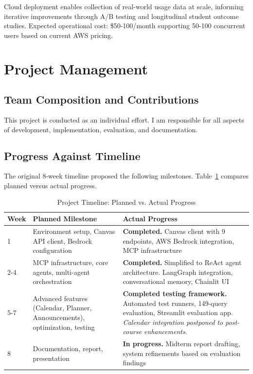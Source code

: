 \documentclass{article}
\begin{document}
Cloud deployment enables collection of real-world usage data at scale, informing iterative improvements through A/B testing and longitudinal student outcome studies. Expected operational cost: \$50-100/month supporting 50-100 concurrent users based on current AWS pricing.

\section{Project Management}

\subsection{Team Composition and Contributions}

This project is conducted as an individual effort. I am responsible for all aspects of development, implementation, evaluation, and documentation.

\subsection{Progress Against Timeline}

The original 8-week timeline proposed the following milestones. Table~\ref{tab:timeline} compares planned versus actual progress.

\begin{table}[h]
\centering
\caption{Project Timeline: Planned vs. Actual Progress}
\label{tab:timeline}
\begin{tabular}{lp{5cm}p{5cm}}
\toprule
\textbf{Week} & \textbf{Planned Milestone} & \textbf{Actual Progress} \\
\midrule
1 & Environment setup, Canvas API client, Bedrock configuration & \textbf{Completed.} Canvas client with 9 endpoints, AWS Bedrock integration, MCP infrastructure \\
\midrule
2-4 & MCP infrastructure, core agents, multi-agent orchestration & \textbf{Completed.} Simplified to ReAct agent architecture. LangGraph integration, conversational memory, Chainlit UI \\
\midrule
5-7 & Advanced features (Calendar, Planner, Announcements), optimization, testing & \textbf{Completed testing framework.} Automated test runners, 149-query evaluation, Streamlit evaluation app. \textit{Calendar integration postponed to post-course enhancements.} \\
\midrule
8 & Documentation, report, presentation & \textbf{In progress.} Midterm report drafting, system refinements based on evaluation findings \\
\bottomrule
\end{tabular}
\end{table}
\end{document}
